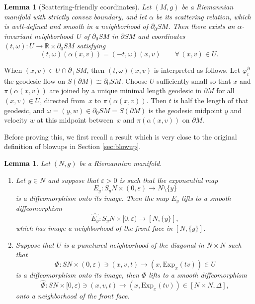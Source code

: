 \documentclass[11pt]{article}
\let\backslash\setminus
\newenvironment{enumeratei}
{\bgroup\def\theenumi{\roman{enumi}}\def\theenumii{\arabic{enumii}}\begin{enumerate}}
{\end{enumerate}\egroup}
\theoremstyle{plain}
\newtheorem{Lemma}[Theorem]{Lemma}
\theoremstyle{definition}
\theoremstyle{remark}
\def\Rm{{\mathbb{R}}}
\newcommand{\del}{\partial}
\begin{document}
\begin{Lemma}[Scattering-friendly coordinates]\label{lem:scatcoords}
Let $(M,g)$ be a Riemannian manifold with strictly convex boundary, and let $\alpha$ be its scattering relation, which is well-defined and smooth in
a neighborhood of $\partial_0 SM$. Then there exists an $\alpha$-invariant neighborhood~$U$ of $\partial_0 SM$ in $\partial SM$ and coordinates $(t,\omega)\colon U\to \Rm\times \partial_0 SM$ satisfying\vspace*{-3pt}\enlargethispage{.5\baselineskip}
\begin{equation*}
(t,\omega) (\alpha(x,v)) = (-t,\omega)(x,v) \qquad \forall\, (x,v)\in U.
\end{equation*}
\end{Lemma}

When $(x,v)\in U\cap \partial_+ SM$, then $(t,\omega)(x,v)$ is interpreted as follows. Let $\varphi_t^\partial$ the geodesic
flow on $S(\partial M) \cong \partial_0 SM$. Choose $U$ sufficiently small so that $x$ and $\pi(\alpha(x,v))$ are joined
by a unique minimal length geodesic in $\del M$ for all $(x,v) \in U$, directed from~$x$ to $\pi(\alpha(x,v))$. Then $t$ is half the length of that geodesic, and $\omega = (y,w)\in \partial_0 SM = S(\partial M)$ is the geodesic midpoint $y$ and velocity $w$ at this midpoint between~$x$ and $\pi(\alpha(x,v))$ on $\del M$.

Before proving this, we first recall a result which is very close to the original definition of blowups in Section \ref{sec:blowup}.
\begin{Lemma}\label{lem:lift}
Let $(N,g)$ be a Riemannian manifold.
\begin{enumeratei}
\item\label{lem:lifti}
Let $y\in N$ and suppose that $\varepsilon>0$ is such that the exponential map\vspace*{-3pt}
\[
E_y \colon S_y N \times (0,\varepsilon) \to N\backslash\{y\}
\]
is a diffeomorphism onto its image. Then the map $E_y$ lifts to a smooth diffeomorphism\vspace*{-3pt}
\begin{equation*}
\widehat{E_y}\colon S_y N\times [0,\varepsilon) \to [N,\{y\}],
\end{equation*}
which has image a neighborhood of the front face in $[N, \{y\}]$.

\item\label{lem:liftii}
Suppose that $U$ is a punctured neighborhood of the diagonal in $N\times N$ such that\vspace*{-3pt}
\begin{equation*}
\Phi\colon SN\times (0,\varepsilon) \ni (x,v,t) \to (x,\mathrm{Exp}_{x}(tv)) \in U
\end{equation*}
is a diffeomorphism onto its image, then $\Phi$ lifts to a smooth diffeomorphism
\begin{equation*}
\widehat{\Phi}\colon SN\times [0,\varepsilon) \ni (x,v,t) \to (x,\mathrm{Exp}_{x}(tv)) \in [N\times N,\Delta],
\end{equation*}
onto a neighborhood of the front face.
\end{enumeratei}
\end{Lemma}
\end{document}
